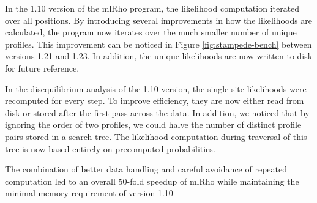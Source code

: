 \documentclass{sig-alternate}
\begin{document}
In the 1.10 version of the mlRho program, the likelihood computation iterated over all positions. By
introducing several improvements in how the likelihoods are calculated, the program now iterates over the much
smaller number of unique profiles. This improvement can be noticed in Figure \ref{fig:stampede-bench} between
versions 1.21 and 1.23.
In addition, the unique likelihoods are now written to disk for future reference.

In the disequilibrium analysis of the 1.10 version, the single-site likelihoods were recomputed for every
step. To improve efficiency, they are now either read from disk or stored after the first pass across the
data. In addition, we noticed that by ignoring the order of two profiles, we could halve the number of
distinct profile pairs stored in a search tree. The likelihood computation during traversal of this tree is
now based entirely on precomputed probabilities.


The combination of better data handling and careful avoidance of repeated computation led to an overall 50-fold
speedup of mlRho while maintaining the minimal memory 
requirement of version 1.10
\end{document}
